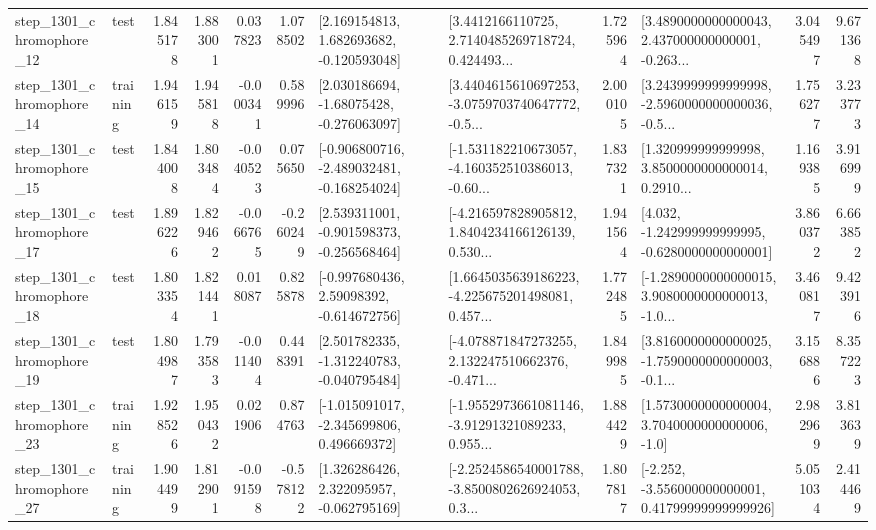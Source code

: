 \begin{tabular}{llrrrrllrlrr}
 step\_1301\_chromophore\_12 &      test &      1.845178 &    1.883001 &      0.037823 &  1.078502 &    [2.169154813, 1.682693682, -0.120593048] &  [3.4412166110725, 2.7140485269718724, 0.424493... &       1.725964 &  [3.4890000000000043, 2.437000000000001, -0.263... &            3.045497 &          9.671368 \\
 step\_1301\_chromophore\_14 &  training &      1.946159 &    1.945818 &     -0.000341 &  0.589996 &    [2.030186694, -1.68075428, -0.276063097] &  [3.4404615610697253, -3.0759703740647772, -0.5... &       2.000105 &  [3.2439999999999998, -2.5960000000000036, -0.5... &            1.756277 &          3.233773 \\
 step\_1301\_chromophore\_15 &      test &      1.844008 &    1.803484 &     -0.040523 &  0.075650 &  [-0.906800716, -2.489032481, -0.168254024] &  [-1.531182210673057, -4.160352510386013, -0.60... &       1.837321 &  [1.320999999999998, 3.8500000000000014, 0.2910... &            1.169385 &          3.916999 \\
 step\_1301\_chromophore\_17 &      test &      1.896226 &    1.829462 &     -0.066765 & -0.260249 &   [2.539311001, -0.901598373, -0.256568464] &  [-4.216597828905812, 1.8404234166126139, 0.530... &       1.941564 &   [4.032, -1.242999999999995, -0.6280000000000001] &            3.860372 &          6.663852 \\
 step\_1301\_chromophore\_18 &      test &      1.803354 &    1.821441 &      0.018087 &  0.825878 &    [-0.997680436, 2.59098392, -0.614672756] &  [1.6645035639186223, -4.225675201498081, 0.457... &       1.772485 &  [-1.2890000000000015, 3.9080000000000013, -1.0... &            3.460817 &          9.423916 \\
 step\_1301\_chromophore\_19 &      test &      1.804987 &    1.793583 &     -0.011404 &  0.448391 &   [2.501782335, -1.312240783, -0.040795484] &  [-4.078871847273255, 2.132247510662376, -0.471... &       1.849985 &  [3.8160000000000025, -1.7590000000000003, -0.1... &            3.156886 &          8.357223 \\
 step\_1301\_chromophore\_23 &  training &      1.928526 &    1.950432 &      0.021906 &  0.874763 &   [-1.015091017, -2.345699806, 0.496669372] &  [-1.9552973661081146, -3.91291321089233, 0.955... &       1.884429 &     [1.5730000000000004, 3.7040000000000006, -1.0] &            2.982969 &          3.813639 \\
 step\_1301\_chromophore\_27 &  training &      1.904499 &    1.812901 &     -0.091598 & -0.578122 &    [1.326286426, 2.322095957, -0.062795169] &  [-2.2524586540001788, -3.8500802626924053, 0.3... &       1.807817 &  [-2.252, -3.556000000000001, 0.41799999999999926] &            5.051034 &          2.414469 \\

\end{tabular}
